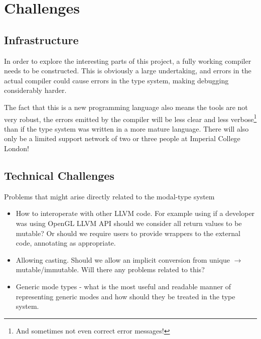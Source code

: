 \documentclass{article}
\begin{document}
\section{Challenges}

\subsection{Infrastructure}

In order to explore the interesting parts of this project, a fully working
compiler needs to be constructed. This is obviously a large undertaking, and
errors in the actual compiler could cause errors in the type system, making
debugging considerably harder.

The fact that this is a new programming language also means the tools are not
very robust, the errors emitted by the compiler will be less clear and less
verbose\footnote{And sometimes not even correct error messages!} than if the
type system was written in a more mature language. There will also only be
a limited support network of two or three people at Imperial College London!

\subsection{Technical Challenges}

Problems that might arise directly related to the modal-type system
	\begin{itemize}
		\item How to interoperate with other LLVM code. For example using if a
		developer was using OpenGL LLVM API should we consider all return
		values to be mutable? Or should we require users to provide wrappers
		to the external code, annotating as appropriate.
		\item Allowing casting. Should we allow an implicit conversion from
              unique $\to$ mutable/immutable. Will there any problems related to
              this?
		\item Generic mode types - what is the most useful and readable manner
              of representing generic modes and how should they be treated in
              the type system.
	\end{itemize}



\end{document}
